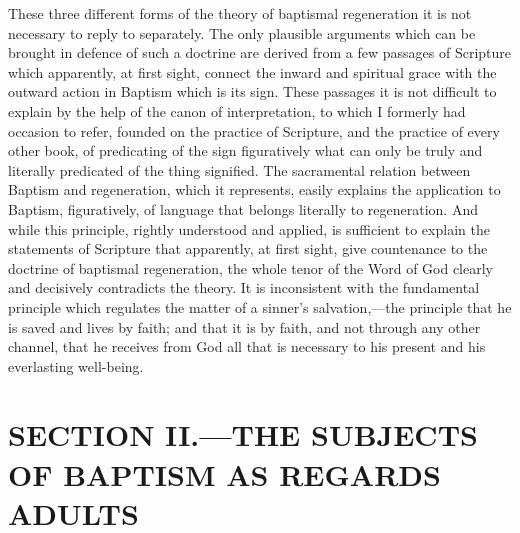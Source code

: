 \documentclass[]{book}
\begin{document}
These three different forms of the theory of baptismal regeneration it is not necessary to reply to separately. The only plausible arguments which can be brought in defence of such a doctrine are derived from a few passages of Scripture which apparently, at first sight, connect the inward and spiritual grace with the outward action in Baptism which is its sign. These passages it is not difficult to explain by the help of the canon of interpretation, to which I formerly had occasion to refer, founded on the practice of Scripture, and the practice of every other book, of predicating of the sign figuratively what can only be truly and literally predicated of the thing signified. The sacramental relation between Baptism and regeneration, which it represents, easily explains the application to Baptism, figuratively, of language that belongs literally to regeneration. And while this principle, rightly understood and applied, is sufficient to explain the statements of Scripture that apparently, at first sight, give countenance to the doctrine of baptismal regeneration, the whole tenor of the Word of God clearly and decisively contradicts the theory. It is inconsistent with the fundamental principle which regulates the matter of a sinner's salvation,---the principle that he is saved and lives by faith; and that it is by faith, and not through any other channel, that he receives from God all that is necessary to his present and his everlasting well-being.

\hypertarget{section-ii.the-subjects-of-baptism-as-regards-adults}{%
\section{SECTION II.---THE SUBJECTS OF BAPTISM AS REGARDS ADULTS}\label{section-ii.the-subjects-of-baptism-as-regards-adults}}
\end{document}
